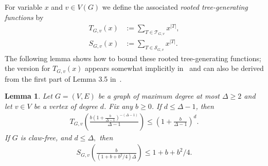 \documentclass[a4paper,11pt,reqno]{amsart}
\newtheorem{lemma}[corollary]{Lemma}
\numberwithin{equation}{section}
\begin{document}
For variable $x$ and $v\in V(G)$ we define the associated \emph{rooted tree-generating functions} by
\begin{align*}
T_{G,v}(x)&:=\sum_{T\in \mathcal{T}_{G,v}} x^{|T|},
\\
S_{G,v}(x)&:=\sum_{T\in \mathcal{S}_{G,v}} x^{|T|}.
\end{align*}
The following lemma shows how to bound these rooted tree-generating functions; the version for $T_{G,v}(x)$ appears somewhat implicitly in~\cite{JPSzeros} and can also be derived from the first part of Lemma 3.5 in~\cite{procacci2024zero}.
\begin{lemma}
\label{lem:tree}
Let $G=(V,E)$ be a graph of maximum degree at most $\Delta\geq 2$ and let $v\in V$ be a vertex of degree $d$.
Fix any $b\geq 0$.
If $d\leq \Delta-1$, then
\begin{align*}
T_{G,v}\left(\frac{b\left(1+\tfrac{b}{\Delta-1}\right)^{-(\Delta-1)}}{\Delta-1}\right)\leq \left(1+\tfrac{b}{\Delta-1}\right)^{d}.
\end{align*}
If $G$ is claw-free, and $d\leq \Delta,$ then
\begin{align*}
S_{G,v}\left(\frac{b}{(1+b+b^2/4)\Delta}\right)\leq 1+b+b^2/4.
\end{align*}
\end{lemma}
\end{document}
